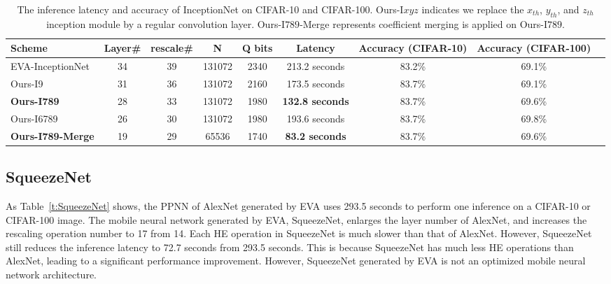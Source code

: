 \documentclass{article}
\begin{document}
	
	\begin{table*}[hbt!]
	\centering
	\small
	\begin{tabular}{|l||c|c|c|c|c|c|c|c|} \hline
		Scheme                & Layer\# & rescale\# &N     & Q bits       & Latency & Accuracy (CIFAR-10) & Accuracy (CIFAR-100)\\\hline\hline
		EVA-InceptionNet          & 34      & 39        &131072& 2340         & 213.2 seconds   & 83.2\%              & 69.1\% \\\hline
		Ours-I9               & 31      & 36        &131072 & 2160      &  173.5 seconds & 83.7\%    & 69.1\%\\\hline
		\textbf{Ours-I789}             & 28      & 33        &131072 & 1980    &  \textbf{132.8 seconds} & 83.7\% & 69.6\% \\\hline
		Ours-I6789            & 26      & 30        &131072 & 1980      &  193.6 seconds & 83.7\%  & 69.8\%\\\hline
		\textbf{Ours-I789-Merge}       & 19      & 29        &65536 & 1740       &  \textbf{83.2 seconds} & 83.7\% & 69.6\%\\\hline
	\end{tabular}
	\caption{The inference latency and accuracy of InceptionNet on CIFAR-10 and CIFAR-100. Ours-I$xyz$ indicates we replace the $x_{th}$, $y_{th}$, and $z_{th}$ inception module by a regular convolution layer. Ours-I$789$-Merge represents coefficient merging is applied on Ours-I$789$.}
	\label{t:InceptionNet}
	\end{table*}








\subsection{SqueezeNet}
	

As Table~\ref{t:SqueezeNet} shows, the PPNN of AlexNet generated by EVA uses 293.5 seconds to perform one inference on a CIFAR-10 or CIFAR-100 image. The mobile neural network generated by EVA, SqueezeNet, enlarges the layer number of AlexNet, and increases the rescaling operation number to 17 from 14. Each HE operation in SqueezeNet is much slower than that of AlexNet. However, SqueezeNet still reduces the inference latency to 72.7 seconds from 293.5 seconds. This is because SqueezeNet has much less HE operations than AlexNet, leading to a significant performance improvement. However, SqueezeNet generated by EVA is not an optimized mobile neural network architecture. 
\end{document}

